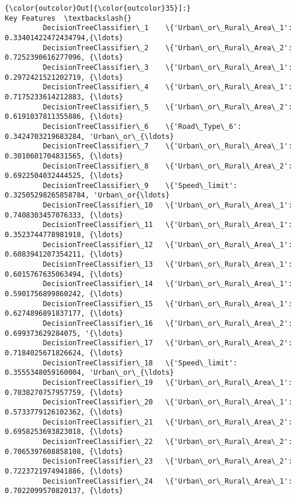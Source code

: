 \documentclass[11pt]{article}
\begin{document}
\begin{Verbatim}[commandchars=\\\{\}]
{\color{outcolor}Out[{\color{outcolor}35}]:}                                                                  Key Features  \textbackslash{}
         DecisionTreeClassifier\_1    \{'Urban\_or\_Rural\_Area\_1': 0.33401422472434794,{\ldots}   
         DecisionTreeClassifier\_2    \{'Urban\_or\_Rural\_Area\_2': 0.7252390616277096, {\ldots}   
         DecisionTreeClassifier\_3    \{'Urban\_or\_Rural\_Area\_1': 0.2972421521202719, {\ldots}   
         DecisionTreeClassifier\_4    \{'Urban\_or\_Rural\_Area\_1': 0.7175233614212883, {\ldots}   
         DecisionTreeClassifier\_5    \{'Urban\_or\_Rural\_Area\_2': 0.6191037811355886, {\ldots}   
         DecisionTreeClassifier\_6    \{'Road\_Type\_6': 0.3424703219683284, 'Urban\_or\_{\ldots}   
         DecisionTreeClassifier\_7    \{'Urban\_or\_Rural\_Area\_1': 0.3010601704831565, {\ldots}   
         DecisionTreeClassifier\_8    \{'Urban\_or\_Rural\_Area\_2': 0.6922504032444525, {\ldots}   
         DecisionTreeClassifier\_9    \{'Speed\_limit': 0.32505298265858784, 'Urban\_or{\ldots}   
         DecisionTreeClassifier\_10   \{'Urban\_or\_Rural\_Area\_1': 0.7408303457076333, {\ldots}   
         DecisionTreeClassifier\_11   \{'Urban\_or\_Rural\_Area\_1': 0.3523744778981918, {\ldots}   
         DecisionTreeClassifier\_12   \{'Urban\_or\_Rural\_Area\_1': 0.6083941207354211, {\ldots}   
         DecisionTreeClassifier\_13   \{'Urban\_or\_Rural\_Area\_1': 0.6015767635063494, {\ldots}   
         DecisionTreeClassifier\_14   \{'Urban\_or\_Rural\_Area\_1': 0.5901756899860242, {\ldots}   
         DecisionTreeClassifier\_15   \{'Urban\_or\_Rural\_Area\_1': 0.6274896891837177, {\ldots}   
         DecisionTreeClassifier\_16   \{'Urban\_or\_Rural\_Area\_2': 0.699373629284075, '{\ldots}   
         DecisionTreeClassifier\_17   \{'Urban\_or\_Rural\_Area\_2': 0.7184025671826624, {\ldots}   
         DecisionTreeClassifier\_18   \{'Speed\_limit': 0.3555348059160004, 'Urban\_or\_{\ldots}   
         DecisionTreeClassifier\_19   \{'Urban\_or\_Rural\_Area\_1': 0.7038270757957759, {\ldots}   
         DecisionTreeClassifier\_20   \{'Urban\_or\_Rural\_Area\_1': 0.5733779126102362, {\ldots}   
         DecisionTreeClassifier\_21   \{'Urban\_or\_Rural\_Area\_2': 0.6958253693823018, {\ldots}   
         DecisionTreeClassifier\_22   \{'Urban\_or\_Rural\_Area\_2': 0.7065397608858108, {\ldots}   
         DecisionTreeClassifier\_23   \{'Urban\_or\_Rural\_Area\_2': 0.7223721974941886, {\ldots}   
         DecisionTreeClassifier\_24   \{'Urban\_or\_Rural\_Area\_1': 0.7022099570820137, {\ldots}   

\end{Verbatim}
\end{document}
